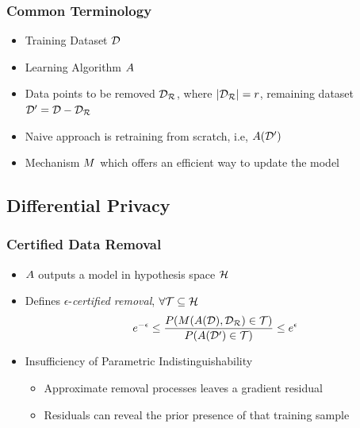 \documentclass[pdf]{beamer}
\begin{document}
\begin{frame}
  \frametitle{Common Terminology}
  \begin{itemize}
    \item Training Dataset $\mathcal{D}$
    \item Learning Algorithm $A$
    \item Data points to be removed $\mathcal{D_{R}}$, where $|\mathcal{D_{R}}|=r$, remaining dataset $\mathcal{D}^{\prime}=\mathcal{D} - \mathcal{D_{R}}$
    \item Naive approach is retraining from scratch, i.e, $A(\mathcal{D}^{\prime})$
    \item Mechanism $M$ which offers an efficient way to update the model
  \end{itemize}
\end{frame}

\subsection{Differential Privacy}
\begin{frame}
  \myNset[1]
  \smartart
\end{frame}

\begin{frame}
  \frametitle{Certified Data Removal \cite{guoCertifiedDataRemoval2020}}
  \begin{itemize}
    \item $A$ outputs a model in hypothesis space $\mathcal{H}$
    \item Defines $\epsilon$-\textit{certified removal}, $\forall \mathcal{T} \subseteq \mathcal{H}$
    \[
      e^{-\epsilon} \le \frac{P(M(A(\mathcal{D}),\mathcal{D_{R}})\in \mathcal{T})}{P(A(\mathcal{D}^{\prime})\in \mathcal{T})} \le e^{\epsilon}
    \]
    \item Insufficiency of Parametric Indistinguishability
    \begin{itemize}
      \item Approximate removal processes leaves a gradient residual 
      \item Residuals can reveal the prior presence of that training sample
    \end{itemize}
  \end{itemize}
\end{frame}
\end{document}
